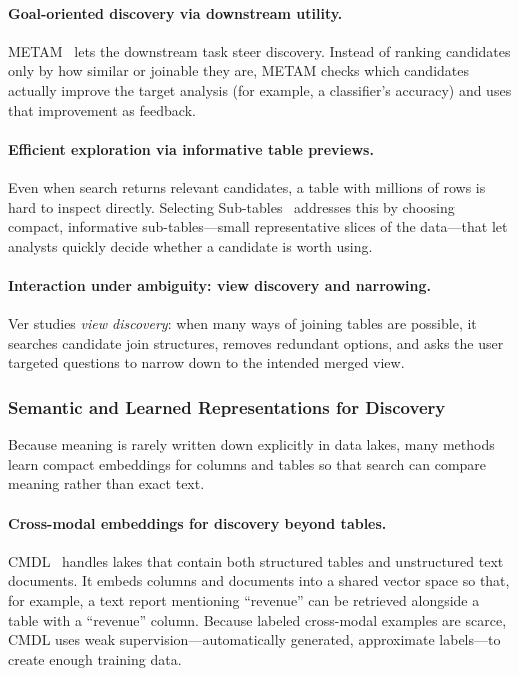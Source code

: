 \documentclass[sigconf]{acmart}
\begin{document}
\paragraph{Goal-oriented discovery via downstream utility.}
METAM~\cite{10184845} lets the downstream task steer discovery. Instead of ranking candidates only by how similar or joinable they are, METAM checks which candidates actually improve the target analysis (for example, a classifier's accuracy) and uses that improvement as feedback.

\paragraph{Efficient exploration via informative table previews.}
Even when search returns relevant candidates, a table with millions of rows is hard to inspect directly. Selecting Sub-tables~\cite{10184535} addresses this by choosing compact, informative sub-tables---small representative slices of the data---that let analysts quickly decide whether a candidate is worth using.

\paragraph{Interaction under ambiguity: view discovery and narrowing.}
Ver studies \emph{view discovery}: when many ways of joining tables are possible, it searches candidate join structures, removes redundant options, and asks the user targeted questions to narrow down to the intended merged view.

\subsubsection{Semantic and Learned Representations for Discovery}
Because meaning is rarely written down explicitly in data lakes, many methods learn compact embeddings for columns and tables so that search can compare meaning rather than exact text.

\paragraph{Cross-modal embeddings for discovery beyond tables.}
CMDL~\cite{10.14778/3611479.3611533} handles lakes that contain both structured tables and unstructured text documents. It embeds columns and documents into a shared vector space so that, for example, a text report mentioning ``revenue'' can be retrieved alongside a table with a ``revenue'' column. Because labeled cross-modal examples are scarce, CMDL uses weak supervision---automatically generated, approximate labels---to create enough training data.
\end{document}
